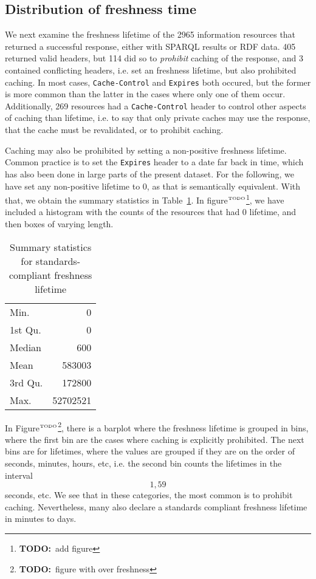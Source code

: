 \documentclass{article}
\newcommand{\httph}[1]{\texttt{#1}}
\newcommand{\todo}[1]{\ensuremath{^{\textrm{\tiny{TODO}\normalsize}}}\footnote{\textbf{TODO:}~#1}}
\begin{document}
\subsection{Distribution of freshness time}

We next examine the freshness lifetime of the 2965 information
resources that returned a successful response, either with SPARQL
results or RDF data. 405 returned valid headers, but 114 did so to
\emph{prohibit} caching of the response, and 3 contained conflicting
headers, i.e. set an freshness lifetime, but also prohibited
caching. In most cases, \httph{Cache-Control} and \httph{Expires} both
occured, but the former is more common than the latter in the cases
where only one of them occur.  Additionally, 269 resources had a
\httph{Cache-Control} header to control other aspects of caching than
lifetime, i.e. to say that only private caches may use the response,
that the cache must be revalidated, or to prohibit caching.

Caching may also be prohibited by setting a non-positive freshness
lifetime. Common practice is to set the \httph{Expires} header to a
date far back in time, which has also been done in large parts of the
present dataset. For the following, we have set any non-positive
lifetime to 0, as that is semantically equivalent. With that, we
obtain the summary statistics in Table~\ref{tab:summaryhard}. In
figure\todo{add figure}, we have included a histogram with the counts
of the resources that had 0 lifetime, and then boxes of varying length.

\begin{table}[ht]
\begin{center}
\caption{Summary statistics for standards-compliant freshness lifetime}\label{tab:summaryhard}
\begin{tabular}{lr}
Min.   &       0   \\ 
1st Qu.&       0   \\ 
Median &     600   \\ 
Mean   &  583003   \\ 
3rd Qu.&  172800   \\ 
Max.   & 52702521   \\ 
   \hline
\end{tabular}
\end{center}
\end{table}

In Figure\todo{figure with over freshness}, there is a barplot where
the freshness lifetime is grouped in bins, where the first bin are the
cases where caching is explicitly prohibited. The next bins are for
lifetimes, where the values are grouped if they are on the order of
seconds, minutes, hours, etc, i.e. the second bin counts the lifetimes
in the interval \[1,59\] seconds, etc. We see that in these
categories, the most common is to prohibit caching. Nevertheless, many
also declare a standards compliant freshness lifetime in minutes to
days.
\end{document}
